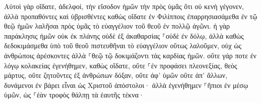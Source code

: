 \documentclass{openreader}
\begin{document}
Αὐτοὶ γὰρ οἴδατε, ἀδελφοί, τὴν εἴσοδον ἡμῶν τὴν πρὸς ὑμᾶς ὅτι οὐ κενὴ γέγονεν, 
ἀλλὰ προπαθόντες καὶ ὑβρισθέντες καθὼς οἴδατε ἐν Φιλίπποις ἐπαρρησιασάμεθα ἐν τῷ θεῷ ἡμῶν λαλῆσαι πρὸς ὑμᾶς τὸ εὐαγγέλιον τοῦ θεοῦ ἐν πολλῷ ἀγῶνι. 
ἡ γὰρ παράκλησις ἡμῶν οὐκ ἐκ πλάνης οὐδὲ ἐξ ἀκαθαρσίας ⸀οὐδὲ ἐν δόλῳ, 
ἀλλὰ καθὼς δεδοκιμάσμεθα ὑπὸ τοῦ θεοῦ πιστευθῆναι τὸ εὐαγγέλιον οὕτως λαλοῦμεν, οὐχ ὡς ἀνθρώποις ἀρέσκοντες ἀλλὰ ⸀θεῷ τῷ δοκιμάζοντι τὰς καρδίας ἡμῶν. 
οὔτε γάρ ποτε ἐν λόγῳ κολακείας ἐγενήθημεν, καθὼς οἴδατε, οὔτε ⸀ἐν προφάσει πλεονεξίας, θεὸς μάρτυς, 
οὔτε ζητοῦντες ἐξ ἀνθρώπων δόξαν, οὔτε ἀφ’ ὑμῶν οὔτε ἀπ’ ἄλλων, 
δυνάμενοι ἐν βάρει εἶναι ὡς Χριστοῦ ἀπόστολοι· ἀλλὰ ἐγενήθημεν ⸀ἤπιοι ἐν μέσῳ ὑμῶν, ὡς ⸀ἐὰν τροφὸς θάλπῃ τὰ ἑαυτῆς τέκνα· 
\end{document}

